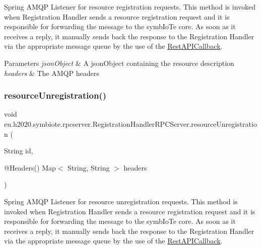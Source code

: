 Spring A\+M\+QP Listener for resource registration requests. This method is invoked when Registration Handler sends a resource registration request and it is responsible for forwarding the message to the symb\+Io\+Te core. As soon as it receives a reply, it manually sends back the response to the Registration Handler via the appropriate message queue by the use of the \hyperlink{classeu_1_1h2020_1_1symbiote_1_1rpcserver_1_1RestAPICallback}{Rest\+A\+P\+I\+Callback}.


\begin{DoxyParams}{Parameters}
{\em json\+Object} & A json\+Object containing the resource description \\
\hline
{\em headers} & The A\+M\+QP headers \\
\hline
\end{DoxyParams}
\mbox{\label{classeu_1_1h2020_1_1symbiote_1_1rpcserver_1_1RegistrationHandlerRPCServer_acbb159563455460f6a3da99e5353d11a}} 
\subsubsection{\texorpdfstring{resource\+Unregistration()}{resourceUnregistration()}}
{\footnotesize\ttfamily void eu.\+h2020.\+symbiote.\+rpcserver.\+Registration\+Handler\+R\+P\+C\+Server.\+resource\+Unregistration (\begin{DoxyParamCaption}\item[{String}]{id,  }\item[{@Headers() Map$<$ String, String $>$}]{headers }\end{DoxyParamCaption})}

Spring A\+M\+QP Listener for resource unregistration requests. This method is invoked when Registration Handler sends a resource registration request and it is responsible for forwarding the message to the symb\+Io\+Te core. As soon as it receives a reply, it manually sends back the response to the Registration Handler via the appropriate message queue by the use of the \hyperlink{classeu_1_1h2020_1_1symbiote_1_1rpcserver_1_1RestAPICallback}{Rest\+A\+P\+I\+Callback}.


